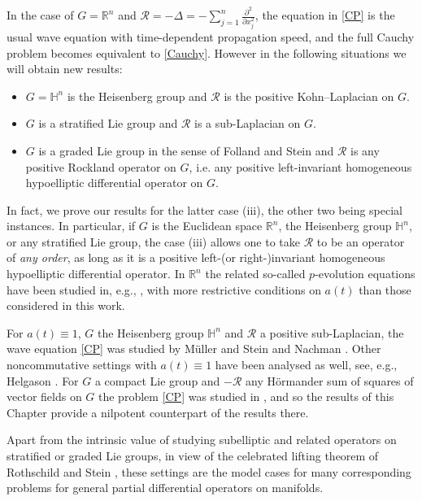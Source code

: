 \documentclass[12pt,oneside,a4paper]{book}
\numberwithin{equation}{section}     %
\theoremstyle{plain}
\theoremstyle{definition}
\newcommand{\R}{{\mathbb R}}
\newcommand{\Rn}{{\R}^n}
\begin{document}
In the case of $G=\Rn$ and $\mathcal R=-\Delta=-\sum_{j=1}^n\frac{\partial^2}{\partial x_j^2}$, the equation in \eqref{CP} is the usual wave equation with time-dependent propagation speed, and the full Cauchy problem becomes equivalent to \eqref{Cauchy}. However in the following situations we will obtain new results:
\begin{itemize}
	\item[(i)] $G=\mathbb H^n$ is the Heisenberg group and $\mathcal R$ is the positive Kohn--Laplacian on $G$.
	\item[(ii)] $G$ is a stratified Lie group and $\mathcal R$ is a sub-Laplacian on $G$.
	\item[(iii)] $G$ is a graded Lie group in the sense of Folland and Stein \cite{FS} and $\mathcal R$ is any positive Rockland operator on $G$, i.e. any positive left-invariant homogeneous hypoelliptic differential operator on $G$.
\end{itemize} 
In fact, we prove our results for the latter case (iii), the other two being special instances. In particular, if $G$ is the Euclidean space $\Rn$, the Heisenberg group $\mathbb H^n$, or any stratified Lie group, the case (iii) allows one to take $\mathcal R$ to be an operator of \textit{any order}, as long as it is a positive left-(or right-)invariant homogeneous hypoelliptic differential operator. In $\Rn$ the related so-called $p$-evolution equations have been studied in, e.g., \cite{CHR08a,CHR08b, CC10}, with more restrictive conditions on $a(t)$ than those considered in this work.

For $a(t)\equiv 1$, $G$ the Heisenberg group $\mathbb H^n$ and $\mathcal R$ a positive sub-Laplacian, the wave equation \eqref{CP} was studied by M\"uller and Stein \cite{Muller-Stein:Lp-wave-Heis} and Nachman \cite{Nachman:wave-Heisenberg-CPDE-1982}.
Other noncommutative settings with $a(t)\equiv 1$ have been analysed as well, see, e.g., Helgason \cite{Helgason:wave-eqns-hom-spaces-1984}.
For $G$ a compact Lie group and $-\mathcal R$ any H\"ormander sum of squares of vector fields on $G$ the problem \eqref{CP} was studied in \cite{GR2015}, and so the results of this Chapter provide a nilpotent counterpart of the results there.

Apart from the intrinsic value of studying subelliptic and related operators on stratified or graded Lie groups, in view of the celebrated lifting theorem of Rothschild and Stein \cite{Rothschild-Stein:AM-1976}, these settings are the model cases for many corresponding problems for general partial differential operators on manifolds.
\end{document}
